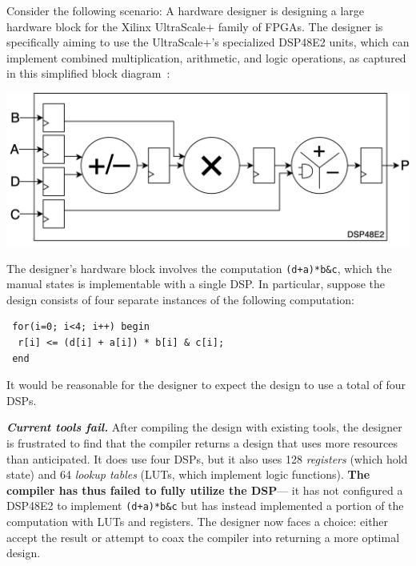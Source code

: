 Consider the following scenario:
A hardware designer
  is designing a large hardware block
  for the Xilinx UltraScale+ family of FPGAs.
The designer is specifically aiming to use 
  the UltraScale+'s specialized DSP48E2 units,
  which 
  can implement 
  combined multiplication, arithmetic,
  and logic operations, as 
  captured in this 
  simplified
  block diagram~\cite{userguide}:
\begin{center}
\includegraphics[width=.75\columnwidth]{lakeroad/assets/dsp48e2-block-diagram-simplified.drawio.png}
\end{center}
The designer's hardware block
  involves the computation
  \texttt{(d+a)*b\&c},
  which the manual states is implementable with a single DSP.
In particular, suppose the design
  consists of four separate instances of the following computation:
\begin{center}
\begin{verbatim}
 for(i=0; i<4; i++) begin
  r[i] <= (d[i] + a[i]) * b[i] & c[i];
 end
\end{verbatim}
\end{center}
It would be reasonable for the designer
  to expect the design
  to use a total of four DSPs.

\textit{\textbf{Current tools fail.}}
After compiling the design
  with existing tools,
  the designer is frustrated
  to find that the compiler returns a design
  that uses more
  resources than anticipated.
It does use four DSPs,
  but it also uses 128
  \textit{registers}
  (which hold state)
  and 64 \textit{lookup tables} 
  (LUTs, which implement logic functions).
\textbf{The compiler has thus failed to 
  fully utilize
  the DSP}---%
  it has not configured a DSP48E2
  to implement
  \texttt{(d+a)*b\&c} but has instead
  implemented a portion of the
  computation
  with LUTs and registers.
The designer now faces a choice:
  either accept the result or attempt to coax the compiler
  into returning a more optimal design.

